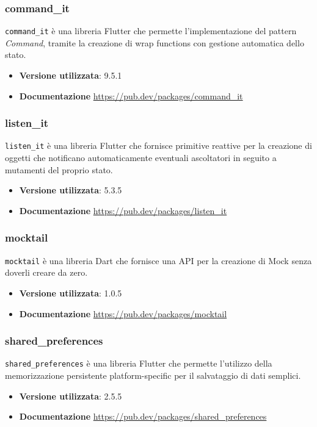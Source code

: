 \documentclass[a4paper,12pt]{article}
\begin{document}
\subsubsection{command\_it}
\texttt{command\_it} è una libreria Flutter che permette l'implementazione del pattern \textit{Command}, tramite la creazione di wrap functions con gestione automatica dello stato. 
\begin{itemize}
    \item \textbf{Versione utilizzata}: 9.5.1
    \item \textbf{Documentazione} \url{https://pub.dev/packages/command_it}
\end{itemize}

\subsubsection{listen\_it}
\texttt{listen\_it} è una libreria Flutter che fornisce primitive reattive per la creazione di oggetti che notificano automaticamente eventuali ascoltatori in seguito a mutamenti del proprio stato.
\begin{itemize}
    \item \textbf{Versione utilizzata}: 5.3.5
    \item \textbf{Documentazione} \url{https://pub.dev/packages/listen_it}
\end{itemize}

\subsubsection{mocktail}
\texttt{mocktail} è una libreria Dart che fornisce una API per la creazione di Mock senza doverli creare da zero.
\begin{itemize}
    \item \textbf{Versione utilizzata}: 1.0.5
    \item \textbf{Documentazione} \url{https://pub.dev/packages/mocktail}
\end{itemize}

\subsubsection{shared\_preferences}
\texttt{shared\_preferences} è una libreria Flutter che permette l'utilizzo della memorizzazione persistente platform-specific per il salvataggio di dati semplici.
\begin{itemize}
    \item \textbf{Versione utilizzata}: 2.5.5
    \item \textbf{Documentazione} \url{https://pub.dev/packages/shared_preferences}
\end{itemize}
\end{document}
